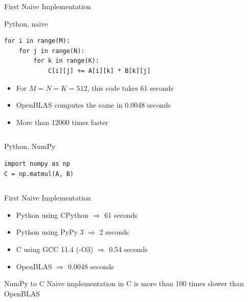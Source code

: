 \documentclass[UKenglish]{beamer}
\begin{document}
\begin{frame}[fragile,c]{First Naive Implementation}
    \begin{exampleblock}{Python, naive}
        \begin{verbatim}
for i in range(M):
    for j in range(N):
        for k in range(K):
            C[i][j] += A[i][k] * B[k][j]
\end{verbatim}
    \end{exampleblock}
    \pause
    \begin{itemize}
        \item For $M=N=K=512$, this code takes 61 seconds
              \pause
        \item OpenBLAS computes the same in 0.0048 seconds
              \pause
        \item More than 12000 times faster
    \end{itemize}
    \pause
    \begin{columns}
        \begin{column}{0.75\textwidth}
            \begin{alertblock}{Python, NumPy}
                \begin{verbatim}
import numpy as np
C = np.matmul(A, B)
\end{verbatim}
            \end{alertblock}
        \end{column}
    \end{columns}
\end{frame}

\begin{frame}[c]{First Naive Implementation}
    \begin{itemize}
        \item Python using CPython \tab $\Longrightarrow$ 61 seconds
              \pause
        \item Python using PyPy 3 \tab $\Longrightarrow$ 2 seconds
              \pause
        \item C using GCC 11.4 (-O3) \tab $\Longrightarrow$ 0.54 seconds
              \pause
        \item OpenBLAS \tab $\Longrightarrow$ 0.0048 seconds
    \end{itemize}

    \pause
    \begin{alertblock}{NumPy to C}
        \small
        Naive implementation in C is more than 100 times slower than OpenBLAS
    \end{alertblock}
\end{frame}
\end{document}
